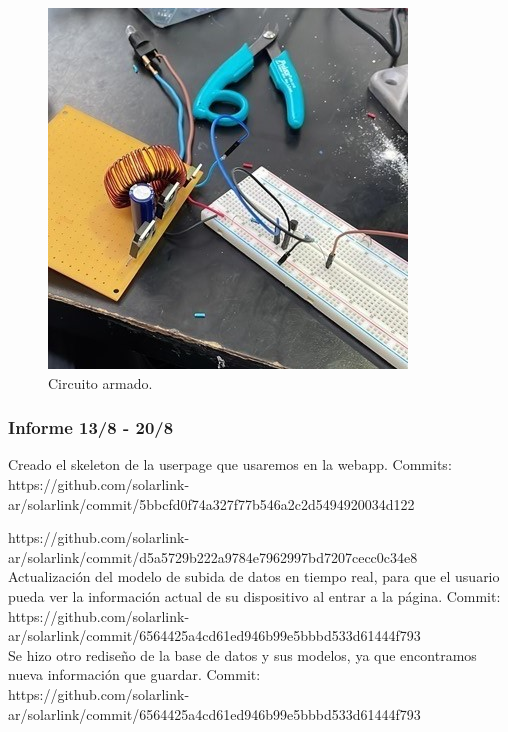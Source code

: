 \begin{figure}[H]
    \centering
    \includegraphics[width=0.65\linewidth]{informes/8902F7C6-42D2-483A-91B5-D2F59D8DF07F.jpg}
    \caption{Circuito armado.}
    
\end{figure}


\subsubsection{Informe 13/8 - 20/8}

Creado el skeleton de la userpage que usaremos en la webapp. Commits:\\
https://github.com/solarlink-\\ar/solarlink/commit/5bbcfd0f74a327f77b546a2c2d5494920034d122

https://github.com/solarlink-\\ar/solarlink/commit/d5a5729b222a9784e7962997bd7207cecc0c34e8\\

Actualización del modelo de subida de datos en tiempo real, para que el usuario pueda ver la información actual de su dispositivo al entrar a la página. Commit:\\
https://github.com/solarlink-\\ar/solarlink/commit/6564425a4cd61ed946b99e5bbbd533d61444f793\\

Se hizo otro rediseño de la base de datos y sus modelos, ya que encontramos nueva información que guardar. Commit:\\
https://github.com/solarlink-\\ar/solarlink/commit/6564425a4cd61ed946b99e5bbbd533d61444f793\\

